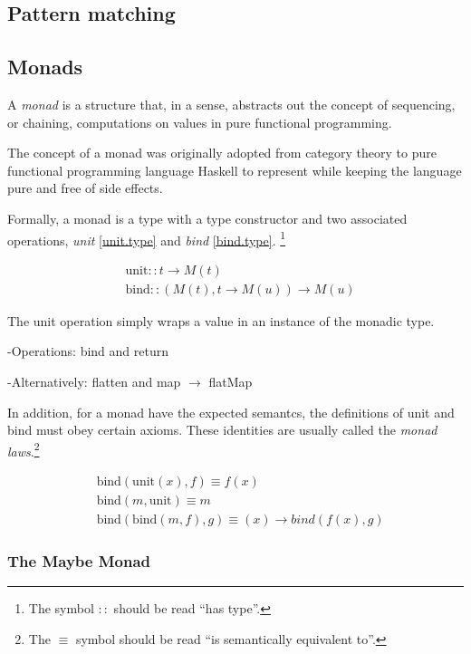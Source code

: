 \subsection{Pattern matching}

\subsection{Monads}

A \emph{monad} is a structure that, in a sense, abstracts out the concept of sequencing, or chaining, computations on values in pure functional programming. 

The concept of a monad was originally adopted from category theory to pure functional programming language Haskell to represent  while keeping the language pure and free of side effects.

Formally, a monad is a type with a type constructor and two associated operations, \emph{unit} \eqref{unit.type} and \emph{bind} \eqref{bind.type}. \footnote{The symbol $::$ should be read ``has type''.}

\begin{align}
& \text{unit} :: t \to M(t) \label{unit.type} \\
& \text{bind} :: (M(t), t \to M(u)) \to M(u) \label{bind.type}
\end{align}

The unit operation simply wraps a value in an instance of the monadic type.

-Operations: bind and return

-Alternatively: flatten and map $\to$ flatMap

In addition, for a monad have the expected semantcs, the definitions of unit and bind must obey certain axioms. These identities are usually called the \emph{monad laws}.\footnote{The $\equiv$ symbol should be read ``is semantically equivalent to''.}

\begin{align}
& \text{bind}(\text{unit}(x), f) \equiv f(x) \\
& \text{bind}(m, \text{unit}) \equiv m \\
& \text{bind}(\text{bind}(m, f), g) \equiv (x) \to bind(f(x), g)
\end{align}

\subsubsection{The Maybe Monad}

